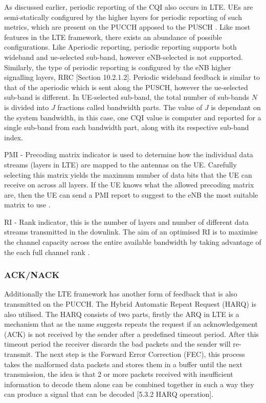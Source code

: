 \documentclass{article}
\begin{document}
As discussed earlier, periodic reporting of the CQI also occurs in LTE. UEs are semi-statically configured by the higher layers for periodic reporting of such metrics, which are present on the PUCCH apposed to the PUSCH \cite[Section 7.2.2]{ETSITS136213}. Like most features in the LTE framework, there exists an abundance of possible configurations. Like Aperiodic reporting, periodic reporting supports both wideband and ue-selected sub-band, however eNB-selected is not supported. Similarly, the type of periodic reporting is configured by the eNB higher signalling layers, RRC \cite{umts_sesia}[Section 10.2.1.2]. Periodic wideband feedback is similar to that of the aperiodic which is sent along the PUSCH, however the ue-selected sub-band is different. In UE-selected sub-band, the total number of sub-bands $N$ is divided into $J$ fractions called bandwidth parts. The value of $J$ is dependant on the system bandwidth, in this case, one CQI value is computer and reported for a single sub-band from each bandwidth part, along with its respective sub-band index.

PMI - Precoding matrix indicator is used to determine how the individual data streams (layers in LTE) are mapped to the antennas on the UE. Carefully selecting this matrix yields the maximum number of data bits that the UE can receive on across all layers. If the UE knows what the allowed precoding matrix are, then the UE can send a PMI report to suggest to the eNB the most suitable matrix to use \cite{csi_defs}.

RI - Rank indicator,  this is the number of layers and number of different data streams transmitted in the downlink. The aim of an optimised RI is to maximise the channel capacity across the entire available bandwidth by taking advantage of the each full channel rank  \cite{csi_defs}. 

\subsubsection{ACK/NACK}

Additionally the LTE framework has another form of feedback that is also transmitted on the PUCCH. The Hybrid Automatic Repeat Request (HARQ) is also utilised. The HARQ consists of two parts, firstly the ARQ in LTE is a mechanism that as the name suggests repeats the request if an acknowledgement (ACK) is not received by the sender after a predefined timeout period.  After this timeout period the receiver discards the bad packets and the sender will re-transmit. The next step is the Forward Error Correction (FEC), this process takes the malformed data packets and stores them in a buffer until the next transmission, the idea is that 2 or more packets received with insufficient information to decode them alone can be combined together in such a way they can produce a signal that can be decoded \cite{3gpp36321}[5.3.2 HARQ operation].
\end{document}
